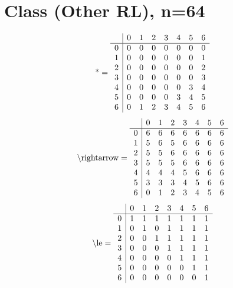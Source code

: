 \documentclass[11pt]{article}
\begin{document}
\section{Class (Other RL), n=64}
\[\text{*} = 
\begin{array}{r | r r r r r r r}
 & 0 & 1 & 2 & 3 & 4 & 5 & 6 \\ \hline
0 & 0 & 0 & 0 & 0 & 0 & 0 & 0 \\
1 & 0 & 0 & 0 & 0 & 0 & 0 & 1 \\
2 & 0 & 0 & 0 & 0 & 0 & 0 & 2 \\
3 & 0 & 0 & 0 & 0 & 0 & 0 & 3 \\
4 & 0 & 0 & 0 & 0 & 0 & 3 & 4 \\
5 & 0 & 0 & 0 & 0 & 3 & 4 & 5 \\
6 & 0 & 1 & 2 & 3 & 4 & 5 & 6 \\
\end{array}
\]
\[\text{\textbackslash rightarrow} = 
\begin{array}{r | r r r r r r r}
 & 0 & 1 & 2 & 3 & 4 & 5 & 6 \\ \hline
0 & 6 & 6 & 6 & 6 & 6 & 6 & 6 \\
1 & 5 & 6 & 5 & 6 & 6 & 6 & 6 \\
2 & 5 & 5 & 6 & 6 & 6 & 6 & 6 \\
3 & 5 & 5 & 5 & 6 & 6 & 6 & 6 \\
4 & 4 & 4 & 4 & 5 & 6 & 6 & 6 \\
5 & 3 & 3 & 3 & 4 & 5 & 6 & 6 \\
6 & 0 & 1 & 2 & 3 & 4 & 5 & 6 \\
\end{array}
\]
\[\text{\textbackslash le} = 
\begin{array}{r | r r r r r r r}
 & 0 & 1 & 2 & 3 & 4 & 5 & 6 \\ \hline
0 & 1 & 1 & 1 & 1 & 1 & 1 & 1 \\
1 & 0 & 1 & 0 & 1 & 1 & 1 & 1 \\
2 & 0 & 0 & 1 & 1 & 1 & 1 & 1 \\
3 & 0 & 0 & 0 & 1 & 1 & 1 & 1 \\
4 & 0 & 0 & 0 & 0 & 1 & 1 & 1 \\
5 & 0 & 0 & 0 & 0 & 0 & 1 & 1 \\
6 & 0 & 0 & 0 & 0 & 0 & 0 & 1 \\
\end{array}
\]
\end{document}
